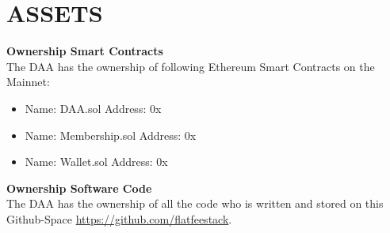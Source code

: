 \section{ASSETS}\label{sec:assets}

\item \textbf{Ownership Smart Contracts} \\
The DAA has the ownership of following Ethereum Smart Contracts on the Mainnet:
\begin{itemize}
    \item Name: DAA.sol Address: 0x %
    \item Name: Membership.sol Address: 0x %
    \item Name: Wallet.sol Address: 0x %
\end{itemize}

\item \textbf{Ownership Software Code} \\
The DAA has the ownership of all the code who is written and stored on this Github-Space \url{https://github.com/flatfeestack}.

